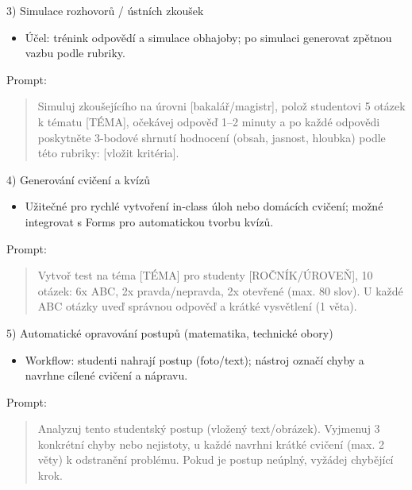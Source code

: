 \documentclass{report}%
\begin{document}
3) Simulace rozhovorů / ústních zkoušek
\begin{itemize}
  \item Účel: trénink odpovědí a simulace obhajoby; po simulaci generovat zpětnou vazbu podle rubriky.
\end{itemize}
Prompt:
\begin{quote}
\begin{PromptBlock}


Simuluj zkoušejícího na úrovni [bakalář/magistr], polož studentovi 5 otázek k tématu [TÉMA], očekávej odpověď 1–2 minuty a po každé odpovědi poskytněte 3-bodové shrnutí hodnocení (obsah, jasnost, hloubka) podle této rubriky: [vložit kritéria].
\end{PromptBlock}


\end{quote}

4) Generování cvičení a kvízů
\begin{itemize}
  \item Užitečné pro rychlé vytvoření in‑class úloh nebo domácích cvičení; možné integrovat s Forms pro automatickou tvorbu kvízů. \cite{kb_ai_101_tipu_pdf_04e4a115_page_36_1}
\end{itemize}
Prompt:
\begin{quote}
\begin{PromptBlock}


Vytvoř test na téma [TÉMA] pro studenty [ROČNÍK/ÚROVEŇ], 10 otázek: 6x ABC, 2x pravda/nepravda, 2x otevřené (max. 80 slov). U každé ABC otázky uveď správnou odpověď a krátké vysvětlení (1 věta).
\end{PromptBlock}


\end{quote}

5) Automatické opravování postupů (matematika, technické obory)
\begin{itemize}
  \item Workflow: studenti nahrají postup (foto/text); nástroj označí chyby a navrhne cílené cvičení a nápravu. \cite{kb_ai_101_tipu_pdf_04e4a115_page_8_1}
\end{itemize}
Prompt:
\begin{quote}
\begin{PromptBlock}


Analyzuj tento studentský postup (vložený text/obrázek). Vyjmenuj 3 konkrétní chyby nebo nejistoty, u každé navrhni krátké cvičení (max. 2 věty) k odstranění problému. Pokud je postup neúplný, vyžádej chybějící krok.
\end{PromptBlock}


\end{quote}
\end{document}
